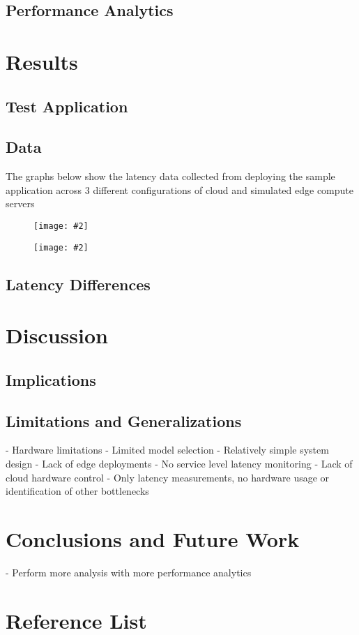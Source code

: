 \documentclass[11pt]{article}
\newcommand{\nocapfigure}[2][0.5] {
    \begin{figure}[H]
    \centering
    \texttt{[image: \#2]}
    \end{figure}
}
\begin{document}
\subsection{Performance Analytics}

\newpage
\section{Results}
\subsection{Test Application}
\subsection{Data}
The graphs below show the latency data collected from deploying the sample application across 3
different configurations of cloud and simulated edge compute servers
\nocapfigure[]{images/latency1}
\nocapfigure[]{images/latency2}
\subsection{Latency Differences}

\newpage
\section{Discussion}
\subsection{Implications}
\subsection{Limitations and Generalizations}
- Hardware limitations
- Limited model selection
- Relatively simple system design
- Lack of edge deployments
- No service level latency monitoring
- Lack of cloud hardware control 
- Only latency measurements, no hardware usage or identification of other bottlenecks

\newpage
\section{Conclusions and Future Work}
- Perform more analysis with more performance analytics

\newpage
\section{Reference List}
\end{document}
